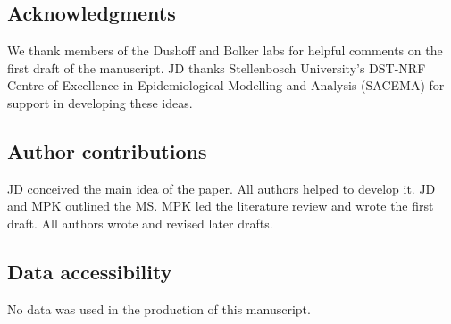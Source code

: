 \documentclass[12pt, english, dvipsnames, table]{article} %
\begin{document}
\subsection*{Acknowledgments}

\noindent We thank members of the Dushoff and Bolker labs for helpful comments on the first draft of the manuscript. JD thanks Stellenbosch University's DST-NRF Centre of Excellence in Epidemiological Modelling and Analysis (SACEMA) for support in developing these ideas.

\subsection*{Author contributions}

\noindent JD conceived the main idea of the paper. All authors helped to develop it. JD and MPK outlined the MS. MPK led the literature review and wrote the first draft. All authors wrote and revised later drafts.

\subsection*{Data accessibility}

\noindent No data was used in the production of this manuscript.

\clearpage



\end{document}
